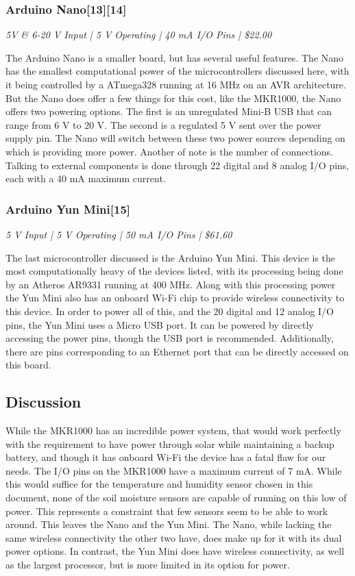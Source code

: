 \documentclass[IEEEtran,letterpaper,10pt,titlepage,fleqn,draftclsnofoot,onecolumn]{article}
\begin{document}
\subsubsection{Arduino Nano[13][14]}
\textit{5V \& 6-20 V Input | 5 V Operating | 40 mA I/O Pins | \$22.00}

\vspace{1mm}

The Arduino Nano is a smaller board, but has several useful features. The Nano has the smallest computational power of the microcontrollers discussed here, with it being controlled by a ATmega328 running at 16 MHz on an AVR architecture. But the Nano does offer a few things for this cost, like the MKR1000, the Nano offers two powering options. The first is an unregulated Mini-B USB that can range from 6 V to 20 V. The second is a regulated 5 V sent over the power supply pin. The Nano will switch between these two power sources depending on which is providing more power. Another of note is the number of connections. Talking to external components is done through 22 digital and 8 analog I/O pins, each with a 40 mA maximum current.
\subsubsection{Arduino Yun Mini[15]}
\textit{5 V Input | 5 V Operating | 50 mA I/O Pins | \$61.60}

\vspace{1mm}

The last microcontroller discussed is the Arduino Yun Mini. This device is the most computationally heavy of the devices listed, with its processing being done by an Atheros AR9331 running at 400 MHz. Along with this processing power the Yun Mini also has an onboard Wi-Fi chip to provide wireless connectivity to this device. In order to power all of this, and the 20 digital and 12 analog I/O pins, the Yun Mini uses a Micro USB port. It can be powered by directly accessing the power pins, though the USB port is recommended. Additionally, there are pins corresponding to an Ethernet port that can be directly accessed on this board.

\subsection{Discussion}

While the MKR1000 has an incredible power system, that would work perfectly with the requirement to have power through solar while maintaining a backup battery, and though it has onboard Wi-Fi the device has a fatal flaw for our needs. The I/O pins on the MKR1000 have a maximum current of 7 mA. While this would suffice for the temperature and humidity sensor chosen in this document, none of the soil moisture sensors are capable of running on this low of power. This represents a constraint that few sensors seem to be able to work around. This leaves the Nano and the Yun Mini. The Nano, while lacking the same wireless connectivity the other two have, does make up for it with its dual power options. In contrast, the Yun Mini does have wireless connectivity, as well as the largest processor, but is more limited in its option for power.
\end{document}
